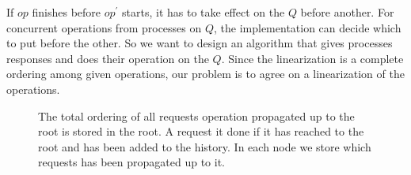 \documentclass[10pt,table]{article}
\theoremstyle{definition}
\begin{document}
%


If $op$ finishes before $op^\prime$ starts, it has to take effect on the $Q$ before another. For concurrent operations from processes on $Q$, the implementation can decide which to put before the other. So we want to design an algorithm that gives processes responses and does their operation on the $Q$. Since the linearization is a complete ordering among given operations, our problem is to agree on a linearization of the operations.


\begin{figure}[h]
\begin{center}
\caption{The total ordering of all requests operation propagated up to the root is stored in the root. A request it done if it has reached to the root and has been added to the history. In each node we store which requests has been propagated up to it.}
\end{center}
\end{figure}
\end{document}
